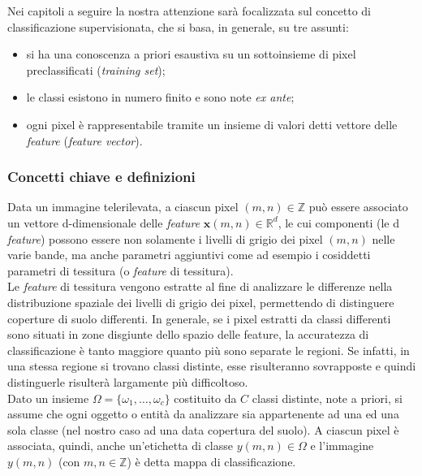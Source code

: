 Nei capitoli a seguire la nostra attenzione sarà focalizzata sul concetto di classificazione supervisionata, che si basa, in generale, su tre assunti:
\begin{itemize}
\item si ha una conoscenza a priori esaustiva su un sottoinsieme di pixel preclassificati (\emph{training set});
\item le classi esistono in numero finito e sono note \emph{ex ante};    
\item ogni pixel è rappresentabile tramite un insieme di valori detti vettore delle \emph{feature} (\emph{feature vector}).
\end{itemize}


\subsubsection*{Concetti chiave e definizioni}
Data un immagine telerilevata, a ciascun pixel $(m,n) \in \mathbb{Z}$ può essere associato un vettore d-dimensionale delle \emph{feature} $\textbf{x}(m,n)\in \mathbb{R}^d$, le cui componenti (le d \emph{feature}) possono essere non solamente i livelli di grigio dei pixel $(m,n)$ nelle varie bande, ma anche parametri aggiuntivi come ad esempio i cosiddetti parametri di tessitura (o \emph{feature} di tessitura).\\

Le \emph{feature} di tessitura vengono estratte al fine di analizzare le differenze nella distribuzione spaziale dei livelli di grigio dei pixel, permettendo di distinguere coperture di suolo differenti. In generale, se i pixel estratti da classi differenti sono situati in zone disgiunte dello spazio delle feature, la accuratezza di classificazione è tanto maggiore quanto più sono separate le regioni. Se infatti, in una stessa regione si trovano classi distinte, esse risulteranno sovrapposte e quindi distinguerle risulterà largamente più difficoltoso.
\\

Dato un insieme $\Omega =\lbrace\omega_1,\ldots, \omega_c\rbrace$ costituito da $C$ classi distinte, note a priori, si assume che ogni oggetto o entità da analizzare sia appartenente ad una ed una sola classe (nel nostro caso ad una data copertura del suolo). A ciascun pixel è associata, quindi, anche un'etichetta di classe $y(m,n) \in \Omega$ e l'immagine $y(m,n)$ (con $m,n\in \mathbb{Z}$) è detta mappa di classificazione.
\\

